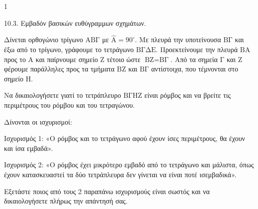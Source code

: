 \begin{ylh}{1}
    \item 10.3. Εμβαδόν βασικών ευθύγραμμων σχημάτων.
\end{ylh}
Δίνεται ορθογώνιο τρίγωνο $\text{ΑΒΓ}$ με \(\hat{\text{A}}=90^\circ\).
Με πλευρά την υποτείνουσα $\text{ΒΓ}$ και έξω από το τρίγωνο, γράφουμε το τετράγωνο $\text{ΒΓΔΕ}$.
Προεκτείνουμε την πλευρά $\text{ΒΑ}$ προς το $\text{Α}$ και παίρνουμε σημείο $\text{Ζ}$ τέτοιο ώστε $\text{ΒΖ} = \text{ΒΓ}$.
Από τα σημεία $\text{Γ}$ και $\text{Ζ}$ φέρουμε παράλληλες προς τα τμήματα $\text{ΒΖ}$ και $\text{ΒΓ}$ αντίστοιχα, που τέμνονται στο σημείο $\text{Η}$.
\begin{alist}
\item Να δικαιολογήσετε γιατί το τετράπλευρο $\text{ΒΓΗΖ}$ είναι ρόμβος και να βρείτε τις περιμέτρους του ρόμβου και του τετραγώνου. 
\item Δίνονται οι ισχυρισμοί:
\begin{rlist}
\item Ισχυρισμός 1: «Ο ρόμβος και το τετράγωνο αφού έχουν ίσες περιμέτρους, θα έχουν και ίσα εμβαδά».
\item Ισχυρισμός 2: «Ο ρόμβος έχει μικρότερο εμβαδό από το τετράγωνο και μάλιστα, όπως έχουν κατασκευαστεί τα δύο τετράπλευρα δεν γίνεται να είναι ποτέ ισεμβαδικά».
\end{rlist}
Εξετάστε ποιος από τους 2 παραπάνω ισχυρισμούς είναι σωστός και να δικαιολογήσετε πλήρως την απάντησή σας. 
\end{alist}